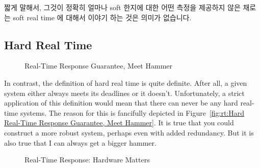 짧게 말해서, 그것이 정확히 얼마나 soft 한지에 대한 어떤 측정을 제공하지 않은
채로는 soft real time 에 대해서 이야기 하는 것은 의미가 없습니다.

\subsection{Hard Real Time}
\label{sec:Hard Real Time}

\begin{figure}[bt]
\centering
{}
\caption{Real-Time Response Guarantee, Meet Hammer}
\end{figure}

In contrast, the definition of hard real time is quite definite.
After all, a given system either always meets its deadlines or it
doesn't.
Unfortunately, a strict application of this definition would mean that
there can never be any hard real-time systems.
The reason for this is fancifully depicted in
Figure~\ref{fig:rt:Hard Real-Time Response Guarantee, Meet Hammer}.
It is true that you could construct a more robust system, perhaps even
with added redundancy.
But it is also true that I can always get a bigger hammer.

\begin{figure}[bt]
\centering
{}
\caption{Real-Time Response: Hardware Matters}
\end{figure}

